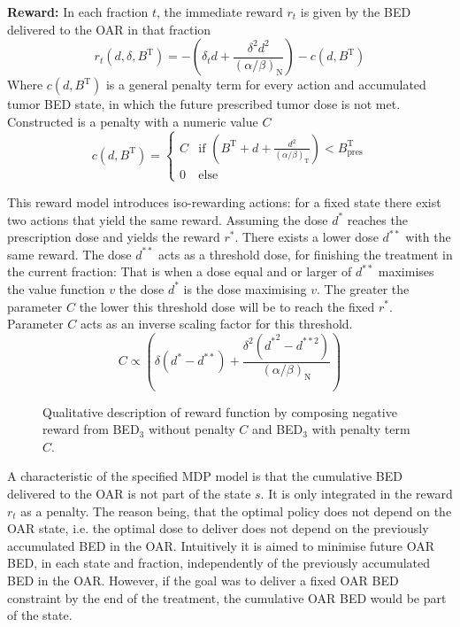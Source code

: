 \documentclass[\relativeRoot/ada.tex]{subfiles}
\begin{document}
\textbf{Reward:} In each fraction $t$, the immediate reward $r_t$ is given by the BED delivered to the OAR in that fraction
\begin{equation*}
    r_t(d, \delta, B^{\text{T}}) = - \left( \delta_t d + \frac{\delta^2 d^2}{(\alpha / \beta)_\text{N}} \right) - c(d, B^{\text{T}})
\end{equation*}
Where $c(d, B^{\text{T}})$ is a general penalty term for every action and accumulated tumor BED state, in which the future prescribed tumor dose is not met. Constructed is a penalty with a numeric value $C$
\begin{equation}\label{eq:penalty}
    c(d, B^{\text{T}}) =
    \begin{cases}
        C & \text{if } \left( B^{\text{T}} + d + \frac{d^2}{(\alpha / \beta)_\text{T}} \right)  < B_{\text{pres}}^{\text{T}}\\
        0 & \text{else}
    \end{cases}
\end{equation}

This reward model introduces iso-rewarding actions: for a fixed state there exist two actions that yield the same reward. Assuming the dose $d^{*}$ reaches the prescription dose and yields the reward $r^{*}$. There exists a lower dose $d^{**}$ with the same reward. The dose $d^{**}$ acts as a threshold dose, for finishing the treatment in the current fraction: That is when a dose equal and or larger of $d^{**}$ maximises the value function $v$ the dose $d^{*}$ is the dose maximising $v$. The greater the parameter $C$ the lower this threshold dose will be to reach the fixed $r^{*}$. Parameter $C$ acts as an inverse scaling factor for this threshold.
\begin{equation*}
    C \propto \left( \delta (d^* - d^{**}) + \frac{\delta^2 \left( {d^*}^2 - d^{**2} \right)}{(\alpha / \beta)_\text{N}} \right)
\end{equation*}

\begin{figure}[!htb]
    
\caption{Qualitative description of reward function by composing negative reward from BED$_{3}$ without penalty $C$ and BED$_{3}$ with penalty term $C$.}
\end{figure}

A characteristic of the specified MDP model is that the cumulative BED delivered to the OAR is not part of the state $s$. It is only integrated in the reward $r_t$ as a penalty. The reason being, that the optimal policy does not depend on the OAR state, i.e. the optimal dose to deliver does not depend on the previously accumulated BED in the OAR. Intuitively it is aimed to minimise future OAR BED, in each state and fraction, independently of the previously accumulated BED in the OAR. However, if the goal was to deliver a fixed OAR BED constraint by the end of the treatment, the cumulative OAR BED would be part of the state.\\
\end{document}
